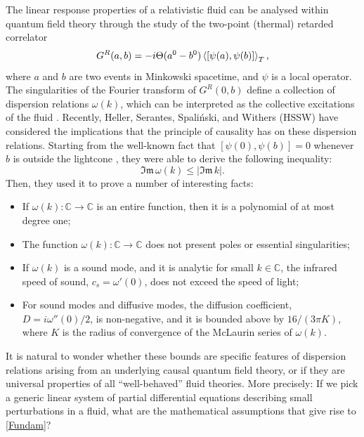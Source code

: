 \documentclass[a4paper, amsfonts, amssymb, amsmath, reprint, showkeys, nofootinbib, twoside,notitlepage]{revtex4-1}
\theoremstyle{definition}
\theoremstyle{theorem}
\theoremstyle{corollary}
\begin{document}
The linear response properties of a relativistic fluid can be analysed within quantum field theory through the study of the two-point (thermal) retarded correlator 
\begin{equation}\label{correlator}
G^R(a,b)=-i\Theta(a^0-b^0)\braket{[\psi(a),\psi(b)]}_T ,
\end{equation}
where $a$ and $b$ are two events in Minkowski spacetime, and $\psi$ is a local operator. The singularities of the Fourier transform of $G^R(0,b)$ define a collection of dispersion relations $\omega(k)$, which can be interpreted as the collective excitations of the fluid \cite{FlorkowskiReview2018}. Recently, Heller, Serantes, Spali\'{n}ski, and Withers (HSSW) \cite{Heller2022} have considered the implications that the principle of causality has on these dispersion relations. Starting from the well-known fact that $[\psi(0),\psi(b)]=0$ whenever $b$ is outside the lightcone \cite{Peskin_book}, they were able to derive the following inequality:
\begin{equation}\label{Fundam}
\mathfrak{Im}\, \omega(k) \leq |\mathfrak{Im} \, k|.
\end{equation}  
Then, they used it to prove a number of interesting facts:
\begin{itemize}
\item[(i)] If $\omega(k):\mathbb{C}\rightarrow \mathbb{C}$ is an entire function, then it is a polynomial of at most degree one;
\item[(ii)] The function $\omega(k):\mathbb{C}\rightarrow \mathbb{C}$ does not present poles or essential singularities; 
\item[(iii)] If $\omega(k)$ is a sound mode, and it is analytic for small $k \in \mathbb{C}$, the infrared speed of sound, $c_s=\omega'(0)$, does not exceed the speed of light;
\item[(iv)] For sound modes and diffusive modes, the diffusion coefficient, $D=i\omega''(0)/2$, is non-negative, and it is bounded above by $16/(3\pi K)$, where $K$ is the radius of convergence of the McLaurin series of $\omega(k)$.
\end{itemize}
It is natural to wonder whether these bounds are specific features of dispersion relations arising from an underlying causal quantum field theory, or if they are universal properties of all ``well-behaved'' fluid theories. More precisely: If we pick a generic linear system of partial differential equations describing small perturbations in a fluid, what are the mathematical assumptions that give rise to \eqref{Fundam}?
\end{document}
